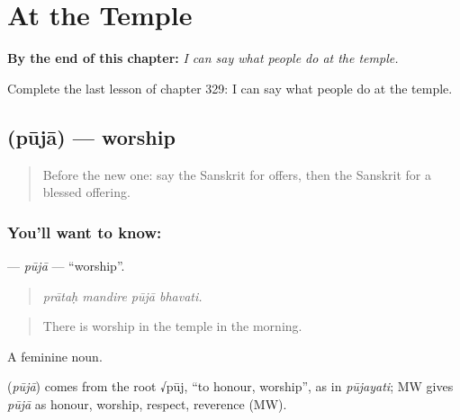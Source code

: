 
\chapter{At the Temple}
\label{ch:sa-at-the-temple}

\begin{chapteropening}
\textbf{By the end of this chapter:} \emph{I can say what people do at the temple.}

Complete the last lesson of chapter 329: I can say what people do at the temple.
\end{chapteropening}

\section[\texorpdfstring{\sk{पूजा} (pūjā)}{पूजा (pūjā)}]{ (pūjā) — worship}

\label{lesson:SA-C329-puja}



\begin{quote}
Before the new one: say the Sanskrit for offers, then the Sanskrit for a blessed offering.
\end{quote}

\subsection*{You'll want to know: }
\textbf{} — \emph{pūjā} — \textquotedblleft{}worship\textquotedblright{}.

\begin{quote}
   
\end{quote}

\begin{quote}
\emph{prātaḥ mandire pūjā bhavati.}
\end{quote}

\begin{quote}
There is worship in the temple in the morning.
\end{quote}

A feminine noun.

\begin{cousinweb}
\textbf{} (\emph{pūjā}) comes from the root √pūj, \textquotedblleft{}to honour, worship\textquotedblright{}, as in \emph{pūjayati}; MW gives \emph{pūjā} as honour, worship, respect, reverence (MW).
\end{cousinweb}

